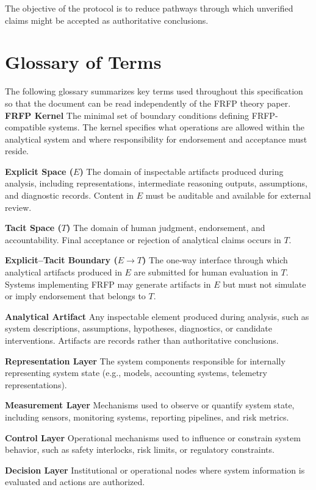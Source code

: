 The objective of the protocol is to reduce pathways through which
unverified claims might be accepted as authoritative conclusions.

\section{Glossary of Terms}
The following glossary summarizes key terms used throughout this
specification so that the document can be read independently of the
FRFP theory paper.
\textbf{FRFP Kernel}  
The minimal set of boundary conditions defining FRFP-compatible systems.
The kernel specifies what operations are allowed within the analytical system
and where responsibility for endorsement and acceptance must reside.

\textbf{Explicit Space ($E$)}  
The domain of inspectable artifacts produced during analysis, including
representations, intermediate reasoning outputs, assumptions, and diagnostic
records. Content in $E$ must be auditable and available for external review.

\textbf{Tacit Space ($T$)}  
The domain of human judgment, endorsement, and accountability.
Final acceptance or rejection of analytical claims occurs in $T$.

\textbf{Explicit–Tacit Boundary ($E \rightarrow T$)}  
The one-way interface through which analytical artifacts produced in $E$
are submitted for human evaluation in $T$. Systems implementing FRFP may
generate artifacts in $E$ but must not simulate or imply endorsement that
belongs to $T$.

\textbf{Analytical Artifact}  
Any inspectable element produced during analysis, such as system
descriptions, assumptions, hypotheses, diagnostics, or candidate
interventions. Artifacts are records rather than authoritative conclusions.

\textbf{Representation Layer}  
The system components responsible for internally representing system state
(e.g., models, accounting systems, telemetry representations).

\textbf{Measurement Layer}  
Mechanisms used to observe or quantify system state, including sensors,
monitoring systems, reporting pipelines, and risk metrics.

\textbf{Control Layer}  
Operational mechanisms used to influence or constrain system behavior,
such as safety interlocks, risk limits, or regulatory constraints.

\textbf{Decision Layer}  
Institutional or operational nodes where system information is evaluated
and actions are authorized.

